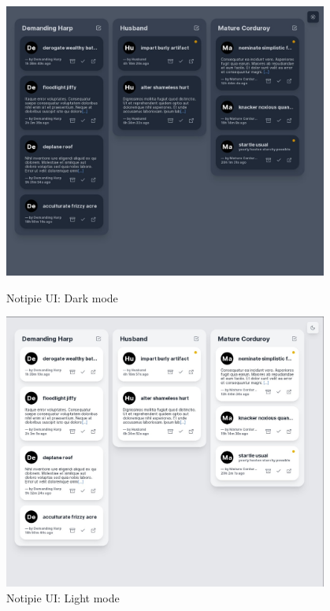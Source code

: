 \begin{figure}[ht]
  \centering
  \begin{minipage}{0.48\textwidth}
    \centering
    \includegraphics[width=0.95\textwidth,keepaspectratio]{img/notipie_dark.jpg}
    \caption{Notipie UI: Dark mode}
    \label{fig:notipie-ui-dark}
  \end{minipage}
  \begin{minipage}{0.48\textwidth}
    \centering
    \includegraphics[width=0.95\textwidth,keepaspectratio]{img/notipie_light.jpg}
    \caption{Notipie UI: Light mode}
    \label{fig:notipie-ui-light}
  \end{minipage}
\end{figure}







